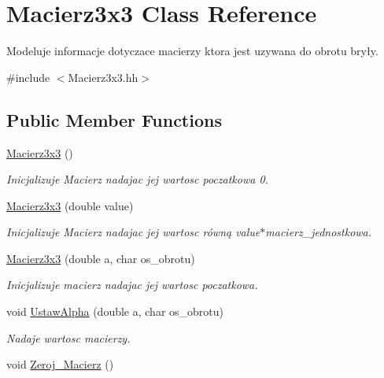 \hypertarget{class_macierz3x3}{\section{Macierz3x3 Class Reference}
\label{class_macierz3x3}
}


Modeluje informacje dotyczace macierzy ktora jest uzywana do obrotu bryły.  




{\ttfamily \#include $<$Macierz3x3.\+hh$>$}

\subsection*{Public Member Functions}
\begin{DoxyCompactItemize}
\item 
\hypertarget{class_macierz3x3_a1ad366312dfea47fa4b94f43fa32be46}{\hyperlink{class_macierz3x3_a1ad366312dfea47fa4b94f43fa32be46}{Macierz3x3} ()}\label{class_macierz3x3_a1ad366312dfea47fa4b94f43fa32be46}

\begin{DoxyCompactList}\small\item\em Inicjalizuje Macierz nadajac jej wartosc poczatkowa 0. \end{DoxyCompactList}\item 
\hypertarget{class_macierz3x3_ad33123a5155598d64b152aecf23cd348}{\hyperlink{class_macierz3x3_ad33123a5155598d64b152aecf23cd348}{Macierz3x3} (double value)}\label{class_macierz3x3_ad33123a5155598d64b152aecf23cd348}

\begin{DoxyCompactList}\small\item\em Inicjalizuje Macierz nadajac jej wartosc równą value$\ast$macierz\+\_\+jednostkowa. \end{DoxyCompactList}\item 
\hyperlink{class_macierz3x3_ab65842d4604b7f5d8d4bafd0e0a37eb6}{Macierz3x3} (double a, char os\+\_\+obrotu)
\begin{DoxyCompactList}\small\item\em Inicjalizuje macierz nadajac jej wartosc poczatkowa. \end{DoxyCompactList}\item 
void \hyperlink{class_macierz3x3_a07ddc464d9359e044aa23224efe54012}{Ustaw\+Alpha} (double a, char os\+\_\+obrotu)
\begin{DoxyCompactList}\small\item\em Nadaje wartosc macierzy. \end{DoxyCompactList}\item 
\hypertarget{class_macierz3x3_a6394cf1ec5548eebd26e242b3b7f7567}{void \hyperlink{class_macierz3x3_a6394cf1ec5548eebd26e242b3b7f7567}{Zeroj\+\_\+\+Macierz} ()}\label{class_macierz3x3_a6394cf1ec5548eebd26e242b3b7f7567}


\end{DoxyCompactItemize}
